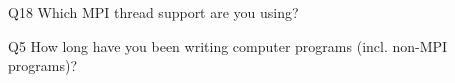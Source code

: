 \begin{description}%
\item{Q18} Which MPI thread support are you using?%
\item{Q5} How long have you been writing computer programs (incl. non-MPI programs)?%
\end{description}%
